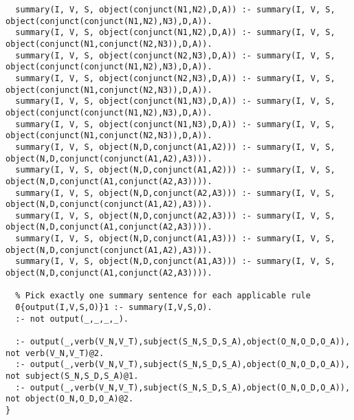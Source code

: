 \begin{lstlisting}
  summary(I, V, S, object(conjunct(N1,N2),D,A)) :- summary(I, V, S, object(conjunct(conjunct(N1,N2),N3),D,A)).
  summary(I, V, S, object(conjunct(N1,N2),D,A)) :- summary(I, V, S, object(conjunct(N1,conjunct(N2,N3)),D,A)).
  summary(I, V, S, object(conjunct(N2,N3),D,A)) :- summary(I, V, S, object(conjunct(conjunct(N1,N2),N3),D,A)).
  summary(I, V, S, object(conjunct(N2,N3),D,A)) :- summary(I, V, S, object(conjunct(N1,conjunct(N2,N3)),D,A)).
  summary(I, V, S, object(conjunct(N1,N3),D,A)) :- summary(I, V, S, object(conjunct(conjunct(N1,N2),N3),D,A)).
  summary(I, V, S, object(conjunct(N1,N3),D,A)) :- summary(I, V, S, object(conjunct(N1,conjunct(N2,N3)),D,A)).
  summary(I, V, S, object(N,D,conjunct(A1,A2))) :- summary(I, V, S, object(N,D,conjunct(conjunct(A1,A2),A3))).
  summary(I, V, S, object(N,D,conjunct(A1,A2))) :- summary(I, V, S, object(N,D,conjunct(A1,conjunct(A2,A3)))).
  summary(I, V, S, object(N,D,conjunct(A2,A3))) :- summary(I, V, S, object(N,D,conjunct(conjunct(A1,A2),A3))).
  summary(I, V, S, object(N,D,conjunct(A2,A3))) :- summary(I, V, S, object(N,D,conjunct(A1,conjunct(A2,A3)))).
  summary(I, V, S, object(N,D,conjunct(A1,A3))) :- summary(I, V, S, object(N,D,conjunct(conjunct(A1,A2),A3))).
  summary(I, V, S, object(N,D,conjunct(A1,A3))) :- summary(I, V, S, object(N,D,conjunct(A1,conjunct(A2,A3)))).

  % Pick exactly one summary sentence for each applicable rule
  0{output(I,V,S,O)}1 :- summary(I,V,S,O).
  :- not output(_,_,_,_).

  :- output(_,verb(V_N,V_T),subject(S_N,S_D,S_A),object(O_N,O_D,O_A)), not verb(V_N,V_T)@2.
  :- output(_,verb(V_N,V_T),subject(S_N,S_D,S_A),object(O_N,O_D,O_A)), not subject(S_N,S_D,S_A)@1.
  :- output(_,verb(V_N,V_T),subject(S_N,S_D,S_A),object(O_N,O_D,O_A)), not object(O_N,O_D,O_A)@2.
}
\end{lstlisting}